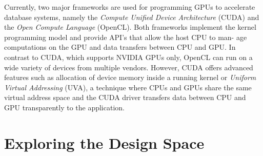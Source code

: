 \documentclass[twocolumn]{article}
\begin{document}
Currently, two major frameworks are used for programming GPUs to accelerate database systems, namely the \textit{Compute Unified Device Architecture} (CUDA) and the \textit{Open Compute Language} (OpenCL). Both frameworks implement the kernel programming model and provide API’s that allow the host CPU to man- age computations on the GPU and data transfers between CPU and GPU. In contrast to CUDA, which supports NVIDIA GPUs only, OpenCL can run on a wide variety of devices from multiple vendors.
However, CUDA offers advanced features such as allocation of device memory inside a running kernel or \textit{Uniform Virtual Addressing} (UVA), a technique where CPUs and GPUs share the same virtual address space and the CUDA driver transfers data between CPU and GPU transparently to the application.

\section{Exploring the Design Space}
\end{document}
